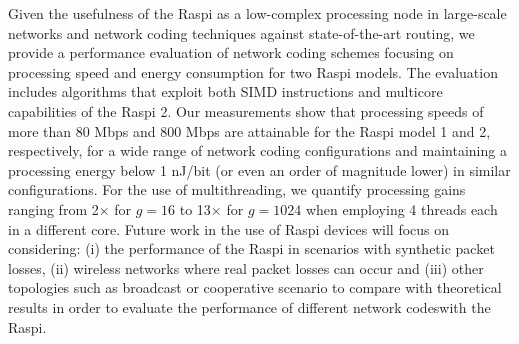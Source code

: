 \label{sec:conclusions}
Given the usefulness of the \ac{Raspi} as a low-complex
processing node in large-scale networks and network coding
techniques against state-of-the-art routing, we provide
a performance evaluation of network coding schemes focusing on
processing speed and energy consumption for two \ac{Raspi} models.
The evaluation includes algorithms that exploit both \ac{SIMD}
instructions and multicore capabilities of the \ac{Raspi} 2. Our
measurements show that processing speeds of more than 80 Mbps and 800
Mbps are attainable for the \ac{Raspi} model 1 and 2, respectively,
for a wide range of network coding configurations and maintaining
a processing energy below 1 nJ/bit (or even an order of magnitude lower)
in similar configurations. For the use of multithreading, we quantify
processing gains ranging from 2$\times$ for $g = 16$ to 13$\times$ for
$g = 1024$ when employing 4 threads each in a different core. Future
work in the use of \ac{Raspi} devices will focus on considering: (i)
the performance of the \ac{Raspi} in scenarios with synthetic packet
losses, (ii) wireless networks where real packet losses can occur
and (iii) other topologies such as broadcast or
cooperative scenario to compare with theoretical results in order to
evaluate the performance of different network codeswith the \ac{Raspi}.